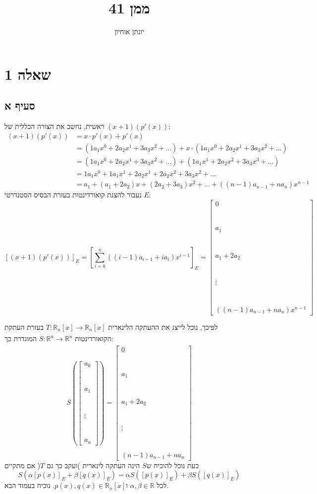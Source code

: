 \documentclass[11pt, oneside]{article}
\title{ממן 41}
\author{יונתן אוחיון}
\newcommand{\br}{\\\\\\\\\\\\\\}
\newcommand{\opr}[1]{\xrightarrow[\text{#1}]{}}
\newcommand{\mR}{\mathbb{R}}
\begin{document}
\maketitle

\section{שאלה 1}
\subsection{סעיף א}
ראשית, נחשב את הצורה הכללית של $(x + 1)(p'(x))$:
\begin{align*}
(x + 1)(p'(x))
& = x \cdot p'(x) + p'(x)\\
& = (1a_1x^0 + 2a_2x^1 + 3a_3x^2 + \dots) + x \cdot (1a_1x^0 + 2a_2x^1 + 3a_3x^2 + \dots)\\
& = (1a_1x^0 + 2a_2x^1 + 3a_3x^2 + \dots) + (1a_1x^1 + 2a_2x^2 + 3a_3x^3 + \dots)\\
& = 1a_1x^0 + 1a_1x^1 + 2a_2x^1 + 2a_2x^2 + 3a_3x^2 + \dots\\
& = a_1 + (a_1 + 2a_2)x + (2a_2 + 3a_3)x^2 + \dots + ((n - 1)a_{n - 1} + na_n)x^{n - 1}
\end{align*}
נעבור להצגת קואורדינטות בעזרת הבסיס הסטנדרטי $E$:
\[
[(x + 1)(p'(x))]_E =
\left[\sum^n_{i=0}((i - 1)a_{i - 1} + ia_i)x^{i - 1}\right]_E =
\begin{bmatrix}
0\br
a_1\br
a_1 + 2a_2\br
\vdots\br
((n - 1)a_{n - 1} + na_n)x^{n - 1}
\end{bmatrix}
\]

לפיכך, נוכל לייצג את ההעתקה הלינארית $T: \mR_n[x] \opr{} \mR_n[x]$ בעזרת העתקת הקואורדינטות $S: \mR^n \opr{} \mR^n$ המוגדרת כך:
\[
S\left(\begin{bmatrix}
a_0\br
a_1\br
\vdots\br
a_n
\end{bmatrix}\right)
=
\begin{bmatrix}
0\br
a_1\br
a_1 + 2a_2\br
\vdots\br
(n - 1)a_{n - 1} + na_n
\end{bmatrix}
\]
כעת נוכל להוכיח ש$S$ הינה העתקה לינארית )ועקב כך גם $T$( אם מתקיים
\[
S(\alpha [p(x)]_E + \beta [q(x)]_E) = \alpha S([p(x)]_E) + \beta S([q(x)]_E)
\]
 לכל $\alpha, \beta \in \mR$ ו$p(x), q(x) \in \mR_n[x]$. נוכיח בעמוד הבא.
\clearpage

\setcounter{subsection}{0}
\end{document}
